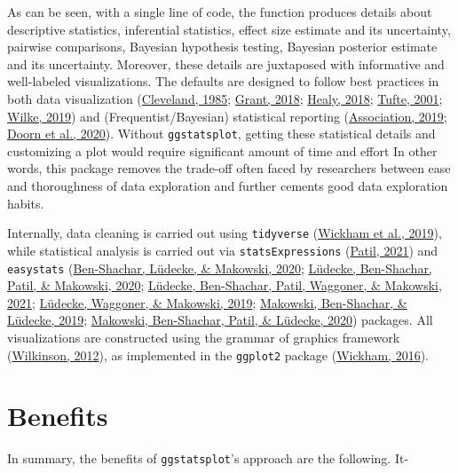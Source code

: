 \documentclass[10pt,a4paper,onecolumn]{article}
\begin{document}
As can be seen, with a single line of code, the function produces
details about descriptive statistics, inferential statistics, effect
size estimate and its uncertainty, pairwise comparisons, Bayesian
hypothesis testing, Bayesian posterior estimate and its uncertainty.
Moreover, these details are juxtaposed with informative and well-labeled
visualizations. The defaults are designed to follow best practices in
both data visualization
(\protect\hyperlink{ref-cleveland1985}{Cleveland, 1985};
\protect\hyperlink{ref-grant2018data}{Grant, 2018};
\protect\hyperlink{ref-healy2018data}{Healy, 2018};
\protect\hyperlink{ref-tufte2001}{Tufte, 2001};
\protect\hyperlink{ref-wilke2019fundamentals}{Wilke, 2019}) and
(Frequentist/Bayesian) statistical reporting
(\protect\hyperlink{ref-apa2019}{Association, 2019};
\protect\hyperlink{ref-van2020jasp}{Doorn et al., 2020}). Without
\texttt{ggstatsplot}, getting these statistical details and customizing
a plot would require significant amount of time and effort In other
words, this package removes the trade-off often faced by researchers
between ease and thoroughness of data exploration and further cements
good data exploration habits.

Internally, data cleaning is carried out using \texttt{tidyverse}
(\protect\hyperlink{ref-Wickham2019}{Wickham et al., 2019}), while
statistical analysis is carried out via \texttt{statsExpressions}
(\protect\hyperlink{ref-Patil2021}{Patil, 2021}) and \texttt{easystats}
(\protect\hyperlink{ref-Ben-Shachar2020}{Ben-Shachar, Lüdecke, \&
Makowski, 2020};
\protect\hyperlink{ref-Luxfcdecke2020parameters}{Lüdecke, Ben-Shachar,
Patil, \& Makowski, 2020};
\protect\hyperlink{ref-Luxfcdecke2020performance}{Lüdecke, Ben-Shachar,
Patil, Waggoner, \& Makowski, 2021};
\protect\hyperlink{ref-Luxfcdecke2019}{Lüdecke, Waggoner, \& Makowski,
2019}; \protect\hyperlink{ref-Makowski2019}{Makowski, Ben-Shachar, \&
Lüdecke, 2019}; \protect\hyperlink{ref-Makowski2020}{Makowski,
Ben-Shachar, Patil, \& Lüdecke, 2020}) packages. All visualizations are
constructed using the grammar of graphics framework
(\protect\hyperlink{ref-Wilkinson2012}{Wilkinson, 2012}), as implemented
in the \texttt{ggplot2} package
(\protect\hyperlink{ref-Wickham2016}{Wickham, 2016}).

\hypertarget{benefits}{%
\section{Benefits}\label{benefits}}

In summary, the benefits of \texttt{ggstatsplot}'s approach are the
following. It-
\end{document}
